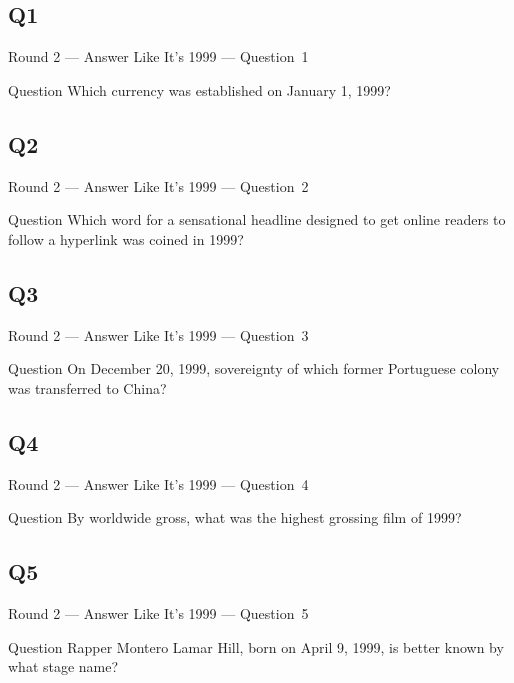 \documentclass[11pt]{beamer}
\begin{document}
\subsection*{Q1}
\begin{frame}[t]{Round 2 --- Answer Like It's 1999 --- \mbox{Question 1}}
\vspace{-0.5em}
\begin{block}{Question}
Which currency was established on January 1, 1999?
\end{block}
\end{frame}
\subsection*{Q2}
\begin{frame}[t]{Round 2 --- Answer Like It's 1999 --- \mbox{Question 2}}
\vspace{-0.5em}
\begin{block}{Question}
Which word for a sensational headline designed to get online readers to follow a hyperlink was coined in 1999?
\end{block}
\end{frame}
\subsection*{Q3}
\begin{frame}[t]{Round 2 --- Answer Like It's 1999 --- \mbox{Question 3}}
\vspace{-0.5em}
\begin{block}{Question}
On December 20, 1999, sovereignty of which former Portuguese colony was transferred to China?
\end{block}
\end{frame}
\subsection*{Q4}
\begin{frame}[t]{Round 2 --- Answer Like It's 1999 --- \mbox{Question 4}}
\vspace{-0.5em}
\begin{block}{Question}
By worldwide gross, what was the highest grossing film of 1999?
\end{block}
\end{frame}
\subsection*{Q5}
\begin{frame}[t]{Round 2 --- Answer Like It's 1999 --- \mbox{Question 5}}
\vspace{-0.5em}
\begin{block}{Question}
Rapper Montero Lamar Hill, born on April 9, 1999, is better known by what stage name?
\end{block}
\end{frame}
\end{document}
